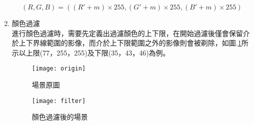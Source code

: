 \begin{enumerate}
$$(R,G,B)=(({R}'+m)\times 255,({G}'+m)\times 255,({B}'+m)\times 255)$$

\item 顏色過濾\\
進行顏色過濾時，需要先定義出過濾顏色的上下限，在開始過濾後僅會保留介於上下界線範圍的影像，而介於上下限範圍之外的影像則會被剃除，如圖.\ref{filter}所示以上限(77，255，255)及下限(35，43，46)為例。\\
\begin{figure}[hbt!]
\center
\begin{minipage}[t]{0.48\textwidth}
\center
\texttt{[image: origin]}
\caption{\Large 場景原圖}
\label{origin}
\end{minipage}
\begin{minipage}[t]{0.48\textwidth}
\center
\texttt{[image: filter]}
\caption{\Large 顏色過濾後的場景}
\label{filter}
\end{minipage}
\end{figure}



\end{enumerate}

\newpage